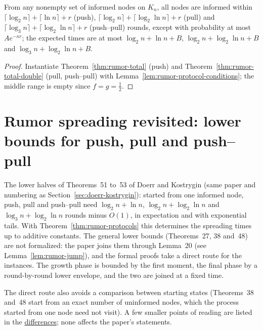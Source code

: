 \begin{theorem}\label{thm:rumor-protocols}
\leanok{}
From any nonempty set of informed nodes on $K_n$, all nodes are informed within
$\lceil\log_2n\rceil+\lceil\ln n\rceil+r$ (push), $\lceil\log_2n\rceil+\lceil\log_2\ln n\rceil+r$
(pull) and $\lceil\log_3n\rceil+\lceil\log_2\ln n\rceil+r$ (push--pull) rounds, except with
probability at most $Ae^{-\kappa r}$; the expected times are at most $\log_2n+\ln n+B$,
$\log_2n+\log_2\ln n+B$ and $\log_3n+\log_2\ln n+B$.
\end{theorem}
\begin{proof}\leanok
Instantiate Theorem~\ref{thm:rumor-total} (push) and Theorem~\ref{thm:rumor-total-double}
(pull, push--pull) with Lemma~\ref{lem:rumor-protocol-conditions}; the middle range is empty since
$f=g=\frac12$.
\end{proof}

\section{Rumor spreading revisited: lower bounds for push, pull and push--pull}\label{sec:doerr-kostrygin-lower}
The lower halves of Theorems~51 to~53 of Doerr and Kostrygin (same paper and numbering as
Section~\ref{sec:doerr-kostrygin}): started from one informed node, push, pull and push--pull
need $\log_2n+\ln n$, $\log_2n+\log_2\ln n$ and $\log_3n+\log_2\ln n$ rounds minus $O(1)$, in
expectation and with exponential tails. With Theorem~\ref{thm:rumor-protocols} this determines the
spreading times up to additive constants. The general lower bounds (Theorems~27, 38 and~48) are
not formalized: the paper joins them through Lemma~20 (see Lemma~\ref{lem:rumor-jump}), and the
formal proofs take a direct route for the instances. The growth phase is bounded by the first
moment, the final phase by a round-by-round lower envelope, and the two are joined at a fixed time.

The direct route also avoids a comparison between starting states (Theorems~38 and~48 start
from an exact number of uninformed nodes, which the process started from one node need not
visit). A few smaller points of reading are listed in the
\href{https://github.com/formal-dynamics/leanamics/blob/main/epidemics/FORMALIZATION_DIFFERENCES.md#lower-bounds-of-theorems-51-to-53-lowerlean}{differences}; none affects the paper's statements.

